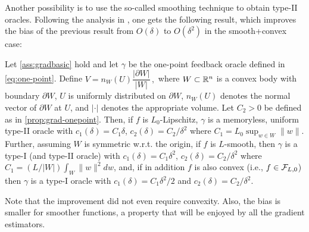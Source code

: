 Another possibility is to use the so-called smoothing technique
\citep{PoTsy90,flaxman2005online,HaLe14:SOC}
to obtain type-II oracles. Following the analysis in \citet{flaxman2005online}, one gets the 
following result, which improves the bias of the previous result from $O(\delta)$ to $O(\delta^2)$ in the smooth+convex case:
\begin{proposition}
\label{prop:flaxman} Let \cref{ass:gradbasic} hold and let $\gamma$ be the one-point feedback oracle defined in \eqref{eq:one-point}.
Define
$
V = n_W(U)\dfrac{\lvert \partial W\rvert}{\lvert W \rvert}\,,
$
where $W \subset \mathbb{R}^n$ is a convex body with boundary $\partial W$, $U$ is uniformly distributed on $\partial W$, $n_W(U)$ denotes the normal vector of $\partial W$ at $U$, and $\lvert \cdot \rvert$ denotes the appropriate volume. Let $C_2>0$ be defined as in \cref{prop:grad-onepoint}.
Then, if $f$ is $L_0$-Lipschitz, $\gamma$ is a memoryless, uniform type-II oracle with $c_1(\delta)=C_1 \delta$, $c_2(\delta) = C_2/\delta^2$ where
$C_1=L_0 \sup_{w \in W}\|w\|$. 
Further, assuming $W$ is symmetric w.r.t. the origin, if $f$ is $L$-smooth, then $\gamma$ is a type-I (and type-II oracle) with $c_1(\delta) = C_1\delta^2$, $c_2(\delta) = C_2/\delta^2$ where $C_1=(L/|W|)\int_W\|w\|^2 dw$, and, if in addition $f$ is also convex (i.e., $f\in \mathcal{F}_{L,0}$) then $\gamma$ is a type-I oracle with $c_1(\delta)=C_1 \delta^2/2$ and $c_2(\delta)=C_2/\delta^2$.
\end{proposition}
Note that the improvement did not even require convexity.
Also, the bias is smaller for smoother functions, a property that will be enjoyed by all the gradient estimators.




